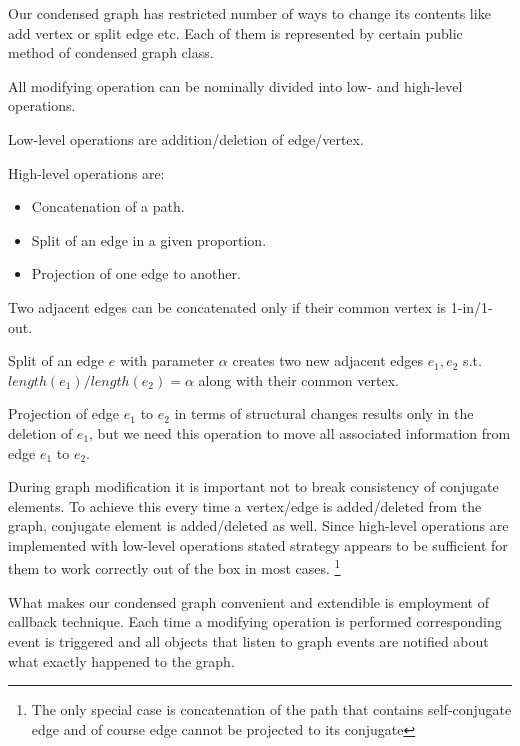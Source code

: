 \documentclass[12pt]{article}
\begin{document}
Our condensed graph has restricted number of ways to change its contents like add vertex or split edge etc. Each of them is represented by certain public method of condensed graph class.

All modifying operation can be nominally divided into low- and high-level operations.

Low-level operations are addition/deletion of edge/vertex.

High-level operations are:
\begin{itemize}
\item Concatenation of a path.
\item Split of an edge in a given proportion. 
\item Projection of one edge to another.
\end{itemize}

Two adjacent edges can be concatenated only if their common vertex is 1-in/1-out.

Split of an edge $e$ with parameter $\alpha$ creates two new adjacent edges $e_1, e_2$ s.t. $length(e_1)/length(e_2) = \alpha$ along with their common vertex.

Projection of edge $e_1$ to $e_2$ in terms of structural changes results only in the deletion of $e_1$, but we need this operation to move all associated information from edge $e_1$ to $e_2$.


During graph modification it is important not to break consistency of conjugate elements. 
To achieve this every time a vertex/edge is added/deleted from the graph, conjugate element is added/deleted as well.
Since high-level operations are implemented with low-level operations stated strategy appears to be sufficient for them to work correctly out of the box in most cases. \footnote{The only special case is concatenation of the path that contains self-conjugate edge and of course edge cannot be projected to its conjugate}


What makes our condensed graph convenient and extendible is employment of callback technique. Each time a modifying operation is performed corresponding event is triggered and all objects that listen to graph events are notified about what exactly happened to the graph.
\end{document}
